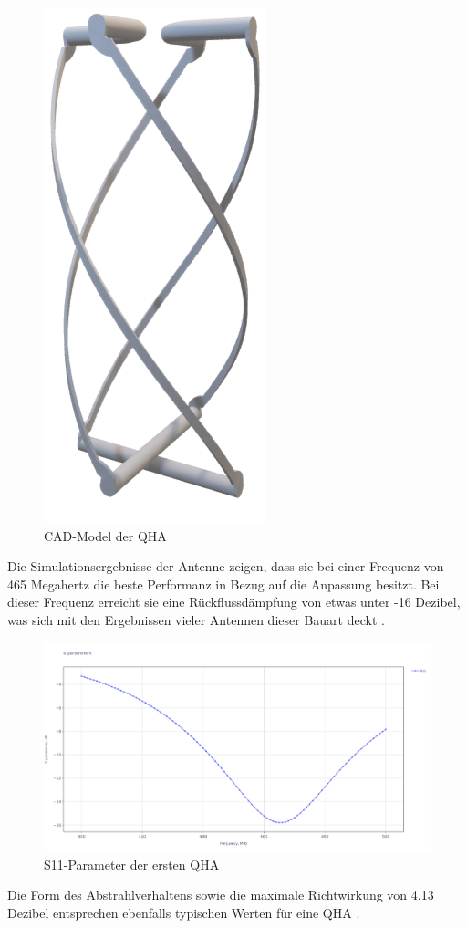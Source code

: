 \begin{figure} [H]
	\centering
	\includegraphics[width=.15\linewidth]{../ref/qfh_render.png}
	\caption{CAD-Model der QHA}
	\label{fig:qfh_render}
\end{figure}

Die Simulationsergebnisse der Antenne zeigen, dass sie bei einer Frequenz von 465 Megahertz die beste Performanz in Bezug auf die Anpassung besitzt. Bei dieser Frequenz erreicht sie eine Rückflussdämpfung von etwas unter -16 Dezibel, was sich mit den Ergebnissen vieler Antennen dieser Bauart deckt \cite{keller_quadrifilar_2015} \cite{noauthor_qfh_nodate}.

\begin{figure} [H]
	\centering
	\includegraphics[width=\linewidth]{../ref/qfh_old_s11.png}
	\caption{S11-Parameter der ersten QHA}
	\label{fig:s11_old_qfh}
\end{figure}

Die Form des Abstrahlverhaltens sowie die maximale Richtwirkung von 4.13 Dezibel entsprechen ebenfalls typischen Werten für eine QHA \cite{keller_quadrifilar_2015}.

